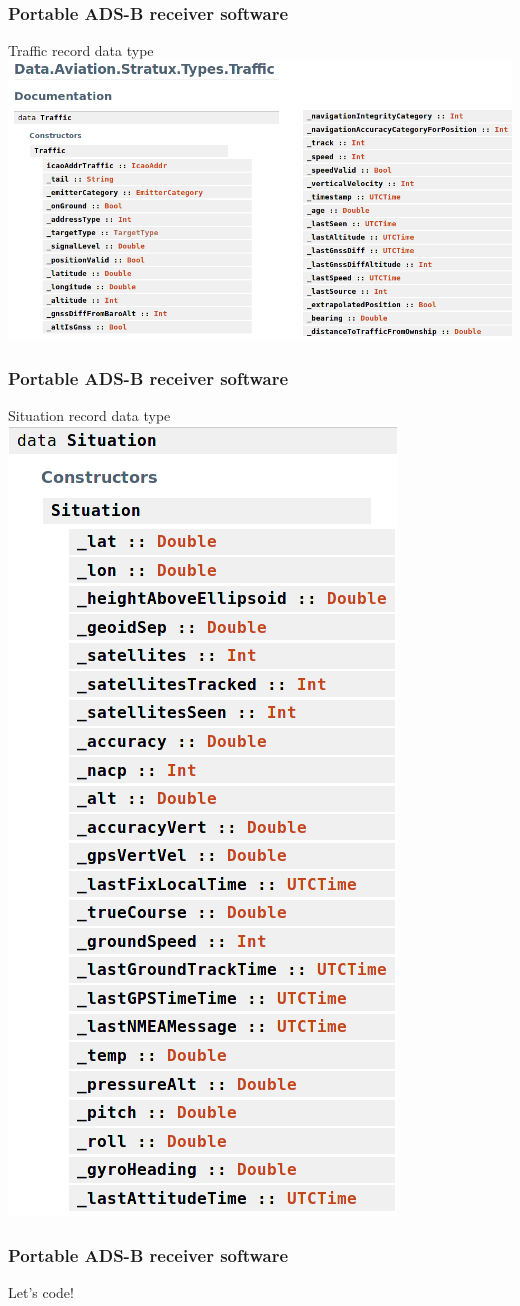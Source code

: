 \begin{frame}
\frametitle{Portable ADS-B receiver software}
\begin{block}{Traffic record data type}
\includegraphics[height=0.6\textheight]{image/stratux-traffic-record.png}
\end{block}
\end{frame}

\begin{frame}
\frametitle{Portable ADS-B receiver software}
\begin{block}{Situation record data type}
\includegraphics[height=0.6\textheight]{image/stratux-situation-record.png}
\end{block}
\end{frame}

\begin{frame}
\frametitle{Portable ADS-B receiver software}
\begin{center}
Let's code!
\end{center}
\end{frame}
